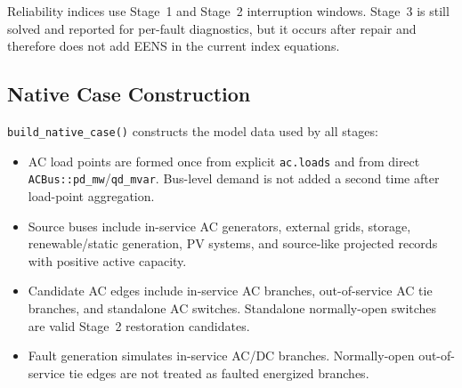 \begin{center}
\end{center}

Reliability indices use Stage~1 and Stage~2 interruption windows.  Stage~3 is
still solved and reported for per-fault diagnostics, but it occurs after repair
and therefore does not add EENS in the current index equations.

\subsection{Native Case Construction}
\label{sec:3stage-native-case}

\texttt{build\_native\_case()} constructs the model data used by all stages:

\begin{itemize}
  \item AC load points are formed once from explicit \texttt{ac.loads} and from
        direct \texttt{ACBus::pd\_mw}/\texttt{qd\_mvar}.  Bus-level demand is
        not added a second time after load-point aggregation.
  \item Source buses include in-service AC generators, external grids, storage,
        renewable/static generation, PV systems, and source-like projected
        records with positive active capacity.
  \item Candidate AC edges include in-service AC branches, out-of-service AC tie
        branches, and standalone AC switches.  Standalone normally-open switches
        are valid Stage~2 restoration candidates.
  \item Fault generation simulates in-service AC/DC branches.  Normally-open
        out-of-service tie edges are not treated as faulted energized branches.
\end{itemize}

